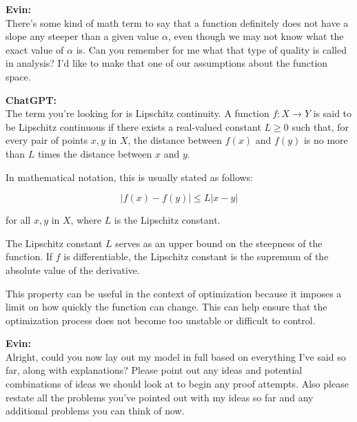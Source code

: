\documentclass{article}[10pt]
\begin{document}
\noindent \textbf{Evin:}\\
There's some kind of math term to say that a function definitely does not have a slope any steeper than a given value $\alpha$, even though we may not know what the exact value of $\alpha$ is. 
Can you remember for me what that type of quality is called in analysis? I'd like to make that one of our assumptions about the function space.\par

\noindent \textbf{ChatGPT:}\\
The term you're looking for is Lipschitz continuity. 
A function \( f: X \rightarrow Y \) is said to be Lipschitz continuous if there exists a real-valued constant \( L \geq 0 \) such that, for every pair of points \( x, y \) in \( X \), the distance between \( f(x) \) and \( f(y) \) is no more than \( L \) times the distance between \( x \) and \( y \).\par

In mathematical notation, this is usually stated as follows:

\[
|f(x) - f(y)| \leq L|x - y|
\]

for all \( x, y \) in \( X \), where \( L \) is the Lipschitz constant.\par

The Lipschitz constant \( L \) serves as an upper bound on the steepness of the function. 
If \( f \) is differentiable, the Lipschitz constant is the supremum of the absolute value of the derivative.\par

This property can be useful in the context of optimization because it imposes a limit on how quickly the function can change. 
This can help ensure that the optimization process does not become too unstable or difficult to control.\par


\noindent \textbf{Evin:}\\
Alright, could you now lay out my model in full based on everything I've said so far, along with explanations? 
Please point out any ideas and potential combinations of ideas we should look at to begin any proof attempts. 
Also please restate all the problems you've pointed out with my ideas so far and any additional problems you can think of now.\par
\end{document}
